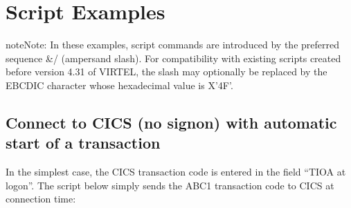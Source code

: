 \documentclass[letterpaper,10pt,english]{sphinxmanual}
\begin{document}
\ignorespaces 

\section{Script Examples}
\label{\detokenize{connectivity_guide:script-examples}}\label{\detokenize{connectivity_guide:index-125}}
\begin{sphinxadmonition}{note}{Note:}
\sphinxAtStartPar
In these examples, script commands are introduced by the preferred sequence \&/ (ampersand slash). For compatibility with existing scripts created before version 4.31 of VIRTEL, the slash may optionally be replaced by the EBCDIC character whose hexadecimal value is X’4F’.
\end{sphinxadmonition}

\ignorespaces 

\subsection{Connect to CICS (no sign\sphinxhyphen{}on) with automatic start of a transaction}
\label{\detokenize{connectivity_guide:connect-to-cics-no-sign-on-with-automatic-start-of-a-transaction}}\label{\detokenize{connectivity_guide:index-126}}
\sphinxAtStartPar
In the simplest case, the CICS transaction code is entered in the field “TIOA at logon”. The script below simply sends the ABC1 transaction code to CICS at connection time:
\end{document}
